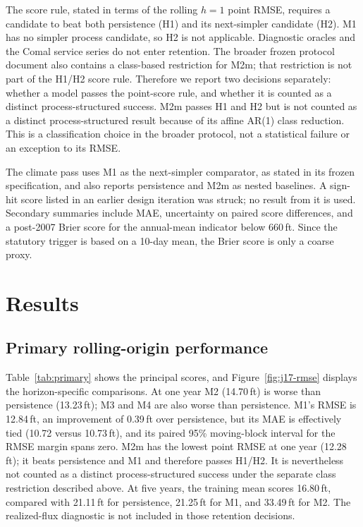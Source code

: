 \documentclass[11pt]{article}
\begin{document}
The score rule, stated in terms of the rolling \(h=1\) point RMSE, requires a candidate to beat both persistence (H1) and its next-simpler candidate (H2). M1 has no simpler process candidate, so H2 is not applicable. Diagnostic oracles and the Comal service series do not enter retention. The broader frozen protocol document also contains a class-based restriction for M2m; that restriction is not part of the H1/H2 score rule. Therefore we report two decisions separately: whether a model passes the point-score rule, and whether it is counted as a distinct process-structured success. M2m passes H1 and H2 but is not counted as a distinct process-structured result because of its affine AR(1) class reduction. This is a classification choice in the broader protocol, not a statistical failure or an exception to its RMSE.

The climate pass uses M1 as the next-simpler comparator, as stated in its frozen specification, and also reports persistence and M2m as nested baselines. A sign-hit score listed in an earlier design iteration was struck; no result from it is used. Secondary summaries include MAE, uncertainty on paired score differences, and a post-2007 Brier score for the annual-mean indicator below 660\,ft. Since the statutory trigger is based on a 10-day mean, the Brier score is only a coarse proxy.

\section{Results}

\subsection{Primary rolling-origin performance}

Table~\ref{tab:primary} shows the principal scores, and Figure~\ref{fig:j17-rmse} displays the horizon-specific comparisons. At one year M2 (14.70\,ft) is worse than persistence (13.23\,ft); M3 and M4 are also worse than persistence. M1's RMSE is 12.84\,ft, an improvement of 0.39\,ft over persistence, but its MAE is effectively tied (10.72 versus 10.73\,ft), and its paired 95\% moving-block interval for the RMSE margin spans zero. M2m has the lowest point RMSE at one year (12.28\,ft); it beats persistence and M1 and therefore passes H1/H2. It is nevertheless not counted as a distinct process-structured success under the separate class restriction described above. At five years, the training mean scores 16.80\,ft, compared with 21.11\,ft for persistence, 21.25\,ft for M1, and 33.49\,ft for M2. The realized-flux diagnostic is not included in those retention decisions.
\end{document}
